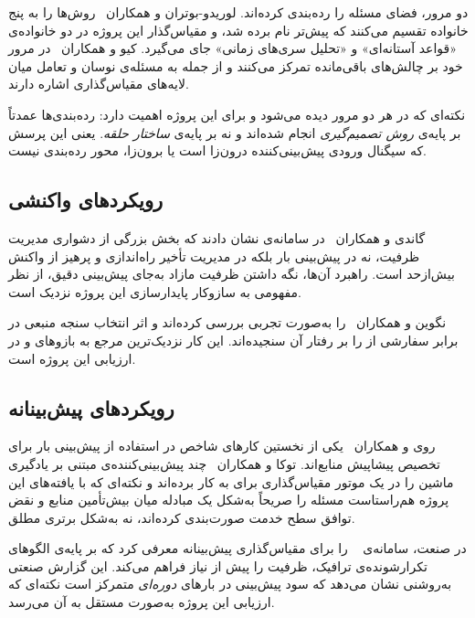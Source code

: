 دو مرور، فضای مسئله را رده‌بندی کرده‌اند. لوریدو-بوتران و همکاران~\cite{lorido2014} روش‌ها را
به پنج خانواده تقسیم می‌کنند که پیش‌تر نام برده شد، و مقیاس‌گذار این پروژه در دو خانواده‌ی
«قواعد آستانه‌ای» و «تحلیل سری‌های زمانی» جای می‌گیرد. کیو و همکاران~\cite{qu2018} در مرور
خود بر چالش‌های باقی‌مانده تمرکز می‌کنند و از جمله به مسئله‌ی نوسان و تعامل میان لایه‌های
مقیاس‌گذاری اشاره دارند.

نکته‌ای که در هر دو مرور دیده می‌شود و برای این پروژه اهمیت دارد: رده‌بندی‌ها عمدتاً بر پایه‌ی
\emph{روش تصمیم‌گیری} انجام شده‌اند و نه بر پایه‌ی \emph{ساختار حلقه}. یعنی این پرسش که
سیگنال ورودی پیش‌بینی‌کننده درون‌زا است یا برون‌زا، محور رده‌بندی نیست.

\subsection{رویکردهای واکنشی}
\label{sec:bg-rw-reactive}

گاندی و همکاران~\cite{gandhi2012} در سامانه‌ی  نشان دادند که بخش بزرگی از
دشواری مدیریت ظرفیت، نه در پیش‌بینی بار بلکه در مدیریت تأخیر راه‌اندازی و پرهیز از واکنش
بیش‌ازحد است. راهبرد آن‌ها، نگه داشتن ظرفیت مازاد به‌جای پیش‌بینی دقیق، از نظر مفهومی به
سازوکار پایدارسازی این پروژه نزدیک است.

نگوین و همکاران~\cite{nguyen2020}  را به‌صورت تجربی بررسی کرده‌اند و اثر انتخاب
سنجه \mdash{} منبعی در برابر سفارشی از  \mdash{} را بر رفتار آن سنجیده‌اند. این کار
نزدیک‌ترین مرجع به بازوهای  و  در ارزیابی این پروژه است.

\subsection{رویکردهای پیش‌بینانه}
\label{sec:bg-rw-predictive}

روی و همکاران~\cite{roy2011} یکی از نخستین کارهای شاخص در استفاده از پیش‌بینی بار برای
تخصیص پیشاپیش منابع‌اند. توکا و همکاران~\cite{toka2021} چند پیش‌بینی‌کننده‌ی مبتنی بر
یادگیری ماشین را در یک موتور مقیاس‌گذاری برای  به کار برده‌اند و \mdash{} نکته‌ای که
با یافته‌های این پروژه هم‌راستاست \mdash{} مسئله را صریحاً به‌شکل یک مبادله میان بیش‌تأمین منابع و
نقض توافق سطح خدمت صورت‌بندی کرده‌اند، نه به‌شکل برتری مطلق.

در صنعت،  سامانه‌ی ~\cite{scryer} را برای مقیاس‌گذاری پیش‌بینانه
معرفی کرد که بر پایه‌ی الگوهای تکرارشونده‌ی ترافیک، ظرفیت را پیش از نیاز فراهم می‌کند. این
گزارش صنعتی به‌روشنی نشان می‌دهد که سود پیش‌بینی در بارهای \emph{دوره‌ای} متمرکز است \mdash{} نکته‌ای
که ارزیابی این پروژه به‌صورت مستقل به آن می‌رسد.

